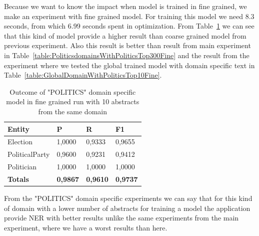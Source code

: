 \documentclass[thesis=M,english]{FITthesis}[2018/05/30]
\begin{document}
	Because we want to know the impact when model is trained in fine grained, we make an experiment with fine grained model. For training this model we need 8.3 seconds, from which 6.99 seconds spent in optimization. From Table~\ref{table:PoliticsDomainWithPoliticsTop10Fine} we can see that this kind of model provide a higher result than coarse grained model from previous experiment. Also this result is better than result from main experiment in Table~\ref{table:PoliticsdomainsWithPoliticsTop300Fine} and the result from the experiment where we tested the global trained model with domain specific text in Table~\ref{table:GlobalDomainWithPoliticsTop10Fine}.
	
	\begin{table}[H]\centering
		\begin{tabular}{|l|l|l|l|}
			\hline {\textbf{Entity}} & {\textbf{P}} & {\textbf{R}} & {\textbf{F1}}\\\hline
				Election & 1,0000 & 0,9333 & 0,9655\\
				PoliticalParty & 0,9600 & 0,9231 & 0,9412\\
				Politician & 1,0000 & 1,0000 & 1,0000\\\hline
				\textbf{Totals} & \textbf{0,9867} & \textbf{0,9610} & \textbf{0,9737}\\\hline
		\end{tabular}
		\caption{Outcome of "POLITICS" domain specific model in fine grained run with 10 abstracts from the same domain \label{table:PoliticsDomainWithPoliticsTop10Fine}}		
	\end{table}	

	From the "POLITICS" domain specific experiments we can say that for this kind of domain with a lower number of abstracts for training a model the application provide NER with better results unlike the same experiments from the main experiment, where we have a worst results than here.
	
	
	
	
\end{document}
